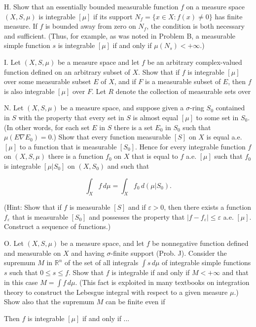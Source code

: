 H. Show that an essentially bounded measurable function $f$ on a measure space $(X, S, \mu)$ is integrable $[\mu]$ if its support $N_f = \{x \in X : f(x) \neq 0\}$ has finite measure. If $f$ is bounded away from zero on $N_f$, the condition is both necessary and sufficient. (Thus, for example, as was noted in Problem B, a measurable simple function $s$ is integrable $[\mu]$ if and only if $\mu(N_s) < +\infty$.)

I. Let $(X, S, \mu)$ be a measure space and let $f$ be an arbitrary complex-valued function defined on an arbitrary subset of $X$. Show that if $f$ is integrable $[\mu]$ over some measurable subset $E$ of $X$, and if $F$ is a measurable subset of $E$, then $f$ is also integrable $[\mu]$ over $F$. Let $R$ denote the collection of measurable sets over

N. Let $(X, S, \mu)$ be a measure space, and suppose given a $\sigma$-ring $S_0$ contained in $S$ with the property that every set in $S$ is almost equal $[\mu]$ to some set in $S_0$. (In other words, for each set $E$ in $S$ there is a set $E_0$ in $S_0$ such that $\mu(E \nabla E_0) = 0$.) Show that every function measurable $[S]$ on $X$ is equal a.e. $[\mu]$ to a function that is measurable $[S_0]$. Hence for every integrable function $f$ on $(X, S, \mu)$ there is a function $f_0$ on $X$ that is equal to $f$ a.e. $[\mu]$ such that $f_0$ is integrable $[\mu|S_0]$ on $(X, S_0)$ and such that

$$\int_X f \, d\mu = \int_X f_0 \, d(\mu|S_0).$$

(Hint: Show that if $f$ is measurable $[S]$ and if $\varepsilon > 0$, then there exists a function $f_\varepsilon$ that is measurable $[S_0]$ and possesses the property that $|f - f_\varepsilon| \leq \varepsilon$ a.e. $[\mu]$. Construct a sequence of functions.)

O. Let $(X, S, \mu)$ be a measure space, and let $f$ be nonnegative function defined and measurable on $X$ and having $\sigma$-finite support (Prob. J). Consider the supremum $M$ in $\mathbb{R}^n$ of the set of all integrals $\int s \, d\mu$ of integrable simple functions $s$ such that $0 \leq s \leq f$. Show that $f$ is integrable if and only if $M < +\infty$ and that in this case $M = \int f \, d\mu$. (This fact is exploited in many textbooks on integration theory to construct the Lebesgue integral with respect to a given measure $\mu$.) Show also that the supremum $M$ can be finite even if

Then $f$ is integrable $[\mu]$ if and only if 
...
